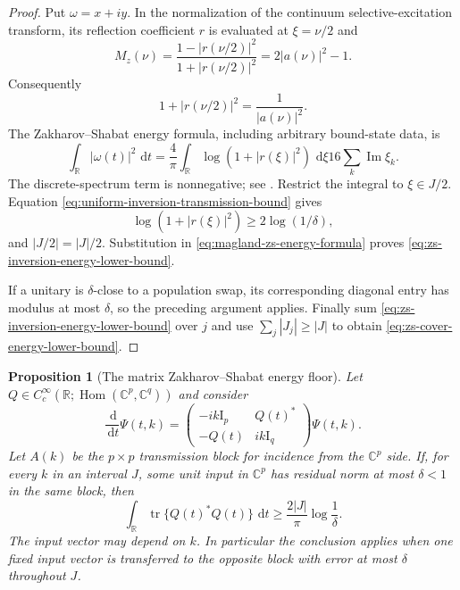 \documentclass[11pt]{article}
\newtheorem{proposition}[theorem]{Proposition}
\theoremstyle{remark}
\newcommand{\Id}{\mathrm I}
\newcommand{\dd}{\,\mathrm d}
\newcommand{\tr}{\operatorname{tr}}
\begin{document}
\begin{proof}
Put $\omega=x+iy$.  In the normalization of the continuum selective-excitation
transform, its reflection coefficient $r$ is evaluated at $\xi=\nu/2$ and
\begin{equation}
 M_z(\nu)
 =
 \frac{1-|r(\nu/2)|^2}{1+|r(\nu/2)|^2}
 =
 2|a(\nu)|^2-1.
 \label{eq:zs-reflection-transmission-identity}
\end{equation}
Consequently
\[
 1+|r(\nu/2)|^2=\frac1{|a(\nu)|^2}.
\]
The Zakharov--Shabat energy formula, including arbitrary bound-state data, is
\begin{equation}
 \int_{\mathbb R}|\omega(t)|^2\,\dd t
 =
 \frac4\pi\int_{\mathbb R}\log(1+|r(\xi)|^2)\,\dd\xi
16\sum_k\operatorname{Im}\xi_k .
 \label{eq:magland-zs-energy-formula}
\end{equation}
The discrete-spectrum term is nonnegative; see
\cite[Section~1.7, ``Energy Formulas'']{Magland2009}.  Restrict the integral to
$\xi\in J/2$.  Equation
\eqref{eq:uniform-inversion-transmission-bound} gives
\[
 \log(1+|r(\xi)|^2)\geq2\log(1/\delta),
\]
and $|J/2|=|J|/2$.  Substitution in
\eqref{eq:magland-zs-energy-formula} proves
\eqref{eq:zs-inversion-energy-lower-bound}.

If a unitary is $\delta$-close to a population swap, its corresponding
diagonal entry has modulus at most $\delta$, so the preceding argument
applies.  Finally sum
\eqref{eq:zs-inversion-energy-lower-bound} over $j$ and use
$\sum_j|J_j|\geq|J|$ to obtain
\eqref{eq:zs-cover-energy-lower-bound}.
\end{proof}

\begin{proposition}[The matrix Zakharov--Shabat energy floor]
\label{prop:matrix-zs-energy-floor}
Let $Q\in C_c^\infty(\mathbb R;
\operatorname{Hom}(\mathbb C^p,\mathbb C^q))$ and consider
\begin{equation}
 \frac{\dd}{\dd t}\Psi(t,k)
 =
 \begin{pmatrix}
  -ik\Id_p&Q(t)^*\\
  -Q(t)&ik\Id_q
 \end{pmatrix}\Psi(t,k).
 \label{eq:matrix-zs-energy-system}
\end{equation}
Let $A(k)$ be the $p\times p$ transmission block for incidence from the
$\mathbb C^p$ side.  If, for every $k$ in an interval $J$, some unit input in
$\mathbb C^p$ has residual norm at most $\delta<1$ in the same block, then
\begin{equation}
 \int_{\mathbb R}\tr\{Q(t)^*Q(t)\}\,\dd t
 \geq
 \frac{2|J|}{\pi}\log\frac1\delta .
 \label{eq:matrix-zs-energy-lower-bound}
\end{equation}
The input vector may depend on $k$.  In particular the conclusion applies
when one fixed input vector is transferred to the opposite block with error
at most $\delta$ throughout $J$.
\end{proposition}
\end{document}
